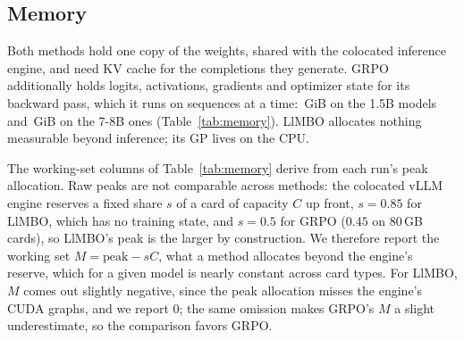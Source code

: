 \documentclass[twoside]{article}
\newcommand{\llmbo}{LlMBO}
\begin{document}
\subsection{Memory}
\label{sec:cost}

\begin{table}[!htbp]
\centering
\caption{Memory per architecture, pooling its models (DeepSeek-7B: the DeepSeek-Math-7B runs, same architecture); weights in bf16. \emph{Layers $\times$ KV heads}: the attention shape that sets the KV cache (head dimension 128 throughout); \emph{KV/seq.}: KV cache of one full-length sequence, 512 prompt + 1024 completion tokens. \emph{Beyond vLLM}: the working set $M$ a method allocates beyond the vLLM engine's reserve, median over runs (for GRPO, one micro-batch of \grpoMicroBatch{} sequences). \emph{Sequences in flight}: estimated full-length sequences a method keeps in flight on each card (\cardSmallGiB{}, \cardFortyGiB{}, \cardLargeGiB{} and \cardEightyGiB{}\,GiB usable). Bold: the better method; : fewer than \grpoMicroBatch{} sequences fit. Derivation and a worked example in the text.}
\label{tab:memory}
\footnotesize\setlength{\tabcolsep}{3pt}
\resizebox{\textwidth}{!}{}
\end{table}

Both methods hold one copy of the weights, shared with the colocated inference engine, and need KV cache for the completions they generate. GRPO additionally holds logits, activations, gradients and optimizer state for its backward pass, which it runs on \grpoMicroBatch{} sequences at a time: \grpoOverheadSmall{}\,GiB on the 1.5B models and \grpoOverheadLarge{}\,GiB on the 7-8B ones (Table~\ref{tab:memory}). \llmbo{} allocates nothing measurable beyond inference; its GP lives on the CPU.

The working-set columns of Table~\ref{tab:memory} derive from each run's peak allocation. Raw peaks are not comparable across methods: the colocated vLLM engine reserves a fixed share $s$ of a card of capacity $C$ up front, $s = 0.85$ for \llmbo{}, which has no training state, and $s = 0.5$ for GRPO ($0.45$ on 80\,GB cards), so \llmbo{}'s peak is the larger by construction. We therefore report the working set $M = \text{peak} - sC$, what a method allocates beyond the engine's reserve, which for a given model is nearly constant across card types. For \llmbo{}, $M$ comes out slightly negative, since the peak allocation misses the engine's CUDA graphs, and we report 0; the same omission makes GRPO's $M$ a slight underestimate, so the comparison favors GRPO.
\end{document}
